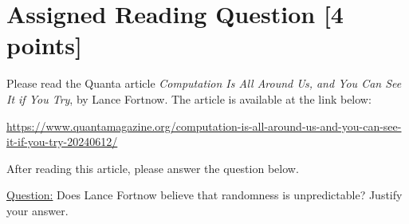 \newpage
\section{Assigned Reading Question [4 points]}
Please read the Quanta article \emph{Computation Is All Around Us, and You Can See It if You Try}, by Lance Fortnow.  The article is available at the link below:
\begin{center}
{\small\href{https://www.quantamagazine.org/computation-is-all-around-us-and-you-can-see-it-if-you-try-20240612/}{https://www.quantamagazine.org/computation-is-all-around-us-and-you-can-see-it-if-you-try-20240612/}}
\end{center}
After reading this article, please answer the question below.

\medskip

\noindent\underline{Question:}
Does Lance Fortnow believe that randomness is unpredictable?  Justify your answer.
